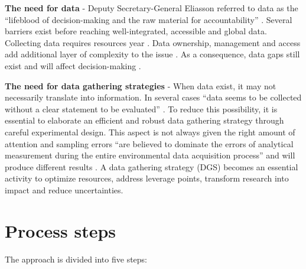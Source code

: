 \documentclass[
]{book}
\begin{document}
\textbf{The need for data} - Deputy Secretary-General Eliasson referred to data as the ``lifeblood of decision-making and the raw material for accountability'' \citep{UNWater2016}. Several barriers exist before reaching well-integrated, accessible and global data. Collecting data requires resources year \citep{Espey2015}. Data ownership, management and access add additional layer of complexity to the issue \citep{Hering2017}. As a consequence, data gaps still exist \citep{Schmidt-Traub2017b, UNwater2019} and will affect decision-making \citep{York2020Measuring}.

\textbf{The need for data gathering strategies} - When data exist, it may not necessarily translate into information. In several cases ``data seems to be collected without a clear statement to be evaluated'' \citep{Rose1992}. To reduce this possibility, it is essential to elaborate an efficient and robust data gathering strategy through careful experimental design. This aspect is not always given the right amount of attention and sampling errors ``are believed to dominate the errors of analytical measurement during the entire environmental data acquisition process'' \citep{Zhang2012} and will produce different results \citep{Abbatangelo2019, Wang2015a}. A data gathering strategy (DGS) becomes an essential activity to optimize resources, address leverage points, transform research into impact and reduce uncertainties.

\hypertarget{process-steps}{%
\section{Process steps}\label{process-steps}}

The approach is divided into five steps:
\end{document}

